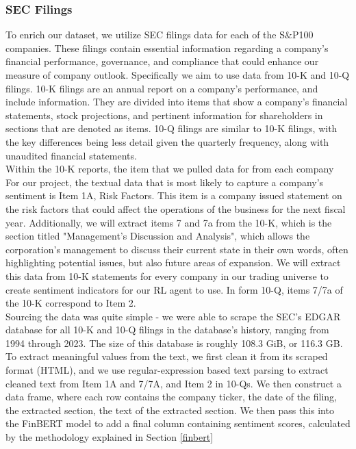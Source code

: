 \subsubsection{SEC Filings}\label{filings}

To enrich our dataset, we utilize SEC filings data for each of the S$\&$P100 companies. 
These filings contain essential information regarding a company's financial 
performance, governance, and compliance that could enhance our measure of 
company outlook. Specifically we aim to use data from 10-K and 10-Q filings. 
10-K filings are an annual report on a company’s performance, and include information. 
They are divided into items that show a company’s financial statements, 
stock projections, and pertinent information for shareholders in sections that 
are denoted as items. 10-Q filings are similar to 10-K filings, with the key differences being less detail given the quarterly frequency, along with unaudited financial statements.\\
Within the 10-K reports, the item that we pulled data for from each company  For our project, the textual data that is most likely to  capture a company’s sentiment is Item 1A, Risk Factors. This item is a company issued statement on the risk factors that could affect the operations of the  business for the next fiscal year. Additionally, we will extract items 7 and 7a from the 10-K, which is the section titled "Management's Discussion and Analysis", which allows the corporation's management to discuss their current state in their own words, often highlighting potential issues, but also future areas of expansion. We will extract this data from 10-K statements for every company in our trading universe to create sentiment indicators for our RL agent to use. In form 10-Q, items 7/7a of the 10-K correspond to Item 2.\\

Sourcing the data was quite simple - we were able to scrape the SEC's EDGAR database for all 10-K and 10-Q filings in the database's history, ranging from 1994 through 2023. The size of this database is roughly 108.3 GiB, or 116.3 GB.\\
To extract meaningful values from the text, we first clean it from its scraped format (HTML), and we use regular-expression based text parsing to extract cleaned text from Item 1A and 7/7A, and Item 2 in 10-Qs. We then construct a data frame, where each row contains the company ticker, the date of the filing, the extracted section, the text of the extracted section. We then pass this into the FinBERT model to add a final column containing sentiment scores, calculated by the methodology explained in Section \ref{finbert}

